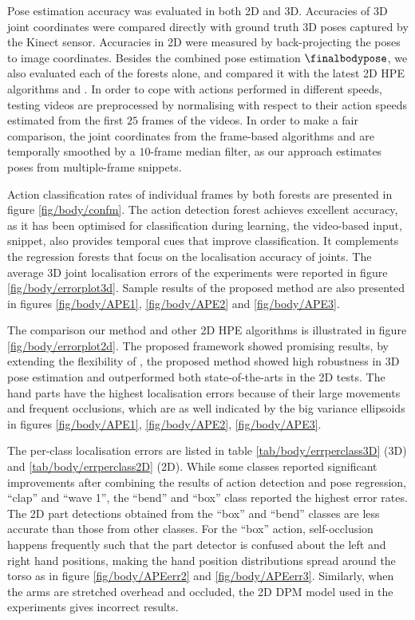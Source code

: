 

Pose estimation accuracy was evaluated in both 2D and 3D. Accuracies of 3D joint coordinates were compared directly with ground truth 3D poses captured by the Kinect sensor. Accuracies in 2D were measured by back-projecting the poses to image coordinates.  
Besides the combined pose estimation $\finalbodypose$, we also evaluated each of the forests alone, and compared it with the latest 2D HPE algorithms \cite{Eichner2012} and \cite{Yang2011}. 
In order to cope with actions performed in different speeds, testing videos are preprocessed by normalising with respect to their action speeds estimated from the first $25$ frames of the videos.
In order to make a fair comparison, the joint coordinates from the frame-based algorithms \cite{Eichner2012} and \cite{Yang2011} are temporally smoothed by a $10$-frame median filter, as our approach estimates poses from multiple-frame snippets. 

Action classification rates of individual frames by both forests are presented in figure \ref{fig/body/confm}. 
The action detection forest achieves excellent accuracy, as it has been optimised for classification during learning, the video-based input, snippet, also provides temporal cues that improve classification. It complements the regression forests that focus on the localisation accuracy of joints.    
The average 3D joint localisation errors of the experiments were reported in figure \ref{fig/body/errorplot3d}. 
Sample results of the proposed method are also presented in figures \ref{fig/body/APE1}, \ref{fig/body/APE2} and \ref{fig/body/APE3}. 

The comparison our method and other 2D HPE algorithms is illustrated in figure \ref{fig/body/errorplot2d}.
The proposed framework showed promising results, by extending the flexibility of \cite{Yang2011}, the proposed method showed high robustness in 3D pose estimation and outperformed both state-of-the-arts in the 2D tests. The hand parts have the highest localisation errors because of their large movements and frequent occlusions, which are as well indicated by the big variance ellipsoids in figures \ref{fig/body/APE1}, \ref{fig/body/APE2}, \ref{fig/body/APE3}.

The per-class localisation errors are listed in table \ref{tab/body/errperclass3D} (3D) and \ref{tab/body/errperclass2D} (2D). While some classes reported significant improvements after combining the results of action detection and pose regression, \eg ``clap'' and ``wave 1'', the ``bend'' and ``box'' class reported the highest error rates.
The 2D part detections obtained from the ``box'' and ``bend'' classes are less accurate than those from other classes.  For the ``box'' action, self-occlusion happens frequently such that the part detector is confused about the left and right hand positions, making the hand position distributions spread around the torso as in figure \ref{fig/body/APEerr2} and \ref{fig/body/APEerr3}. 
Similarly, when the arms are stretched overhead and occluded, the 2D DPM model used in the experiments gives incorrect results.  

